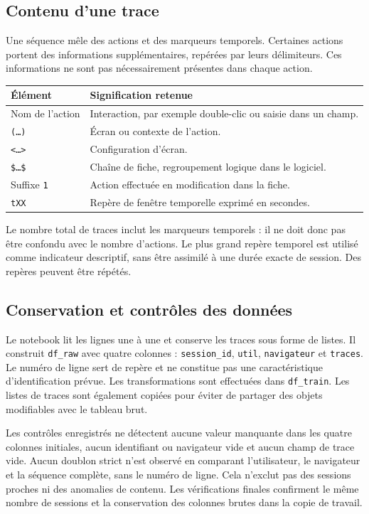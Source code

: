 \documentclass[10pt,a4paper]{article}
\begin{document}
\subsection{Contenu d'une trace}
Une séquence mêle des actions et des marqueurs temporels. Certaines actions
portent des informations supplémentaires, repérées par leurs délimiteurs.
Ces informations ne sont pas nécessairement présentes dans chaque action.

\begin{center}
\begin{tabularx}{\linewidth}{l Y}
\toprule
Élément & Signification retenue \\
\midrule
Nom de l'action & Interaction, par exemple double-clic ou saisie dans un champ. \\
\texttt{(\ldots)} & Écran ou contexte de l'action. \\
\texttt{<\ldots>} & Configuration d'écran. \\
\texttt{\$\ldots\$} & Chaîne de fiche, regroupement logique dans le logiciel. \\
Suffixe \texttt{1} & Action effectuée en modification dans la fiche. \\
\texttt{tXX} & Repère de fenêtre temporelle exprimé en secondes. \\
\bottomrule
\end{tabularx}
\end{center}

Le nombre total de traces inclut les marqueurs temporels : il ne doit donc
pas être confondu avec le nombre d'actions. Le plus grand repère temporel
est utilisé comme indicateur descriptif, sans être assimilé à une durée
exacte de session. Des repères peuvent être répétés.

\subsection{Conservation et contrôles des données}
Le notebook lit les lignes une à une et conserve les traces sous forme de
listes. Il construit \texttt{df\_raw} avec quatre colonnes :
\texttt{session\_id}, \texttt{util}, \texttt{navigateur} et \texttt{traces}.
Le numéro de ligne sert de repère et ne constitue pas une caractéristique
d'identification prévue. Les transformations sont effectuées dans
\texttt{df\_train}. Les listes de traces sont également copiées pour éviter
de partager des objets modifiables avec le tableau brut.

Les contrôles enregistrés ne détectent aucune valeur manquante dans les
quatre colonnes initiales, aucun identifiant ou navigateur vide et aucun
champ de trace vide. Aucun doublon strict n'est observé en comparant
l'utilisateur, le navigateur et la séquence complète, sans le numéro de
ligne. Cela n'exclut pas des sessions proches ni des anomalies de contenu.
Les vérifications finales confirment le même nombre de sessions et la
conservation des colonnes brutes dans la copie de travail.
\end{document}
